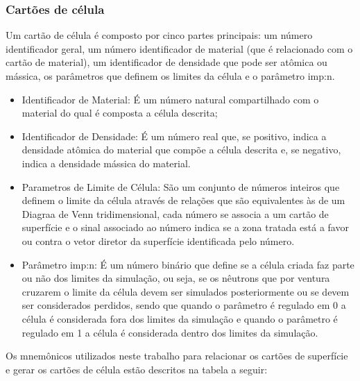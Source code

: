 \documentclass[
	12pt,				%
	openany,			%
	twoside,			%
	a4paper,			%
	english,			%
	french,				%
	spanish,			%
	brazil				%
	]{abntex2}
\begin{document}
\subsubsection*{Cartões de célula }

Um cartão de célula é composto por cinco partes principais: um número identificador geral, um número identificador de material
(que é relacionado com o cartão de material), um identificador de densidade que pode ser atômica ou mássica, os parâmetros que definem os limites da célula e o parâmetro imp:n.

\begin{itemize}
\item Identificador de Material: É um número natural compartilhado com o
material do qual é composta a célula descrita;
\item Identificador de Densidade: É um número real que, se positivo, indica
a densidade atômica do material que compõe a célula descrita e, se
negativo, indica a densidade mássica do material.
\item Parametros de Limite de Célula: São um conjunto de números inteiros
que definem o limite da célula através de relações que são equivalentes
às de um Diagraa de Venn tridimensional, cada número se associa a
um cartão de superfície e o sinal associado ao número indica se a
zona tratada está a favor ou contra o vetor diretor da superfície
identificada pelo número.
\item Parâmetro imp:n: É um número binário que define se a célula criada
faz parte ou não dos limites da simulação, ou seja, se os nêutrons
que por ventura cruzarem o limite da célula devem ser simulados posteriormente
ou se devem ser considerados perdidos, sendo que quando o parâmetro
é regulado em 0 a célula é considerada fora dos limites da simulação
e quando o parâmetro é regulado em 1 a célula é considerada dentro
dos limites da simulação. 
\end{itemize}
Os mnemônicos utilizados neste trabalho para relacionar os cartões
de superfície e gerar os cartões de célula estão descritos na tabela
a seguir:
\end{document}
